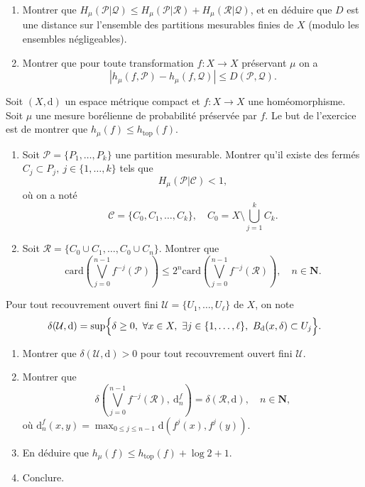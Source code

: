 \documentclass[a4paper,10pt,openany]{article}
\theoremstyle{plain}
\theoremstyle{definition}
\newcommand{\dd}{\mathrm{d}}
\newcommand{\N}{\mathbf{N}}
\begin{document}
\begin{enumerate}
\item Montrer que $H_\mu(\mathcal{P}|\mathcal{Q}) \leq H_\mu(\mathcal{P}|\mathcal{R}) + H_\mu(\mathcal{R}|\mathcal{Q})$, et en d\'eduire que $D$ est une distance sur l'ensemble des partitions mesurables finies de $X$ (modulo les ensembles n\'egligeables).
\item Montrer que pour toute transformation $f : X \to X$ pr\'eservant $\mu$ on a
$$
\left|h_\mu(f, \mathcal{P}) - h_\mu(f, \mathcal{Q})\right| \leq D(\mathcal{P}, \mathcal{Q}).
$$
\end{enumerate}
\vspace{0.6cm}

 \vspace{1.5mm} 

\noindent Soit $(X, \dd)$ un espace m\'etrique compact et $f : X \to X$ une hom\'eomorphisme. Soit $\mu$ une mesure bor\'elienne de probabilit\'e pr\'eserv\'ee par $f$. Le but de l'exercice est de montrer que $h_\mu(f) \leq h_\mathrm{top}(f)$.

\begin{enumerate}
\item Soit $\mathcal{P} = \{P_1, \dots, P_k\}$ une partition mesurable. Montrer qu'il existe des ferm\'es $C_j \subset P_j,~j \in \{1,\dots,k\}$ tels que
$$
H_\mu(\mathcal{P}| \mathcal{C}) < 1,
$$
o\`u on a not\'e
$$
\mathcal{C} = \{C_0, C_1, \dots, C_k\}, \quad C_0 = X \setminus \bigcup_{j=1}^k C_k.
$$
\item Soit $\mathcal{R} = \{C_0 \cup C_1, \dots, C_0 \cup C_n\}$. Montrer que 
$$
\mathrm{card}\left( \bigvee_{j=0}^{n-1} f^{-j}(\mathcal{P})\right) \leq 2^n \mathrm{card}\left(\bigvee_{j=0}^{n-1} f^{-j}(\mathcal{R})\right), \quad n \in \N.
$$
\end{enumerate}
Pour tout recouvrement ouvert fini $\mathcal{U} = \{U_1, \dots, U_\ell\}$ de $X$, on note
$$
\delta(\mathcal{U}, \dd) = \sup \Bigl\{ \delta \geq 0,~\forall x \in X,~\exists j \in \{1, \dots, \ell\},~B_\dd(x, \delta) \subset U_j \Bigr\}. 
$$
\begin{enumerate}[resume]
\item Montrer que $\delta(\mathcal{U}, \dd) > 0$ pour tout recouvrement ouvert fini $\mathcal{U}$.
\item Montrer que
$$
\delta\left(\bigvee_{j=0}^{n-1} f^{-j}(\mathcal{R}),~ \dd_n^f\right) = \delta(\mathcal{R}, \dd), \quad n \in \N,
$$
o\`u $\dd_n^f(x,y) = \max_{0 \leq j \leq n-1} \dd(f^j(x), f^j(y))$.
\item En d\'eduire que $h_\mu(f) \leq h_\mathrm{top}(f) + \log 2 + 1$.
\item Conclure.
\end{enumerate}
\end{document}
